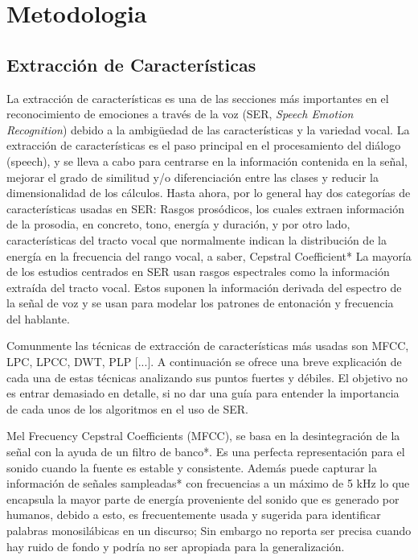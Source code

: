 \documentclass[11pt,a4paper,spanish]{book}
\begin{document}
		\chapter{Metodologia}
		\section{Extracción de Características}
		La extracción de características es una de las secciones más importantes en el reconocimiento de emociones a través de la voz (SER, \emph{Speech Emotion Recognition}) debido a la ambigüedad de las características y la variedad vocal. La extracción de características es el paso principal en el procesamiento del diálogo (speech), y se lleva a cabo para centrarse en la información contenida en la señal, mejorar el grado de similitud y/o diferenciación entre las clases y reducir la dimensionalidad de los cálculos.\cite{Hellbernd2016} Hasta ahora, por lo general hay dos categorías de características usadas en SER:
		Rasgos prosódicos, los cuales extraen información de la prosodia, en concreto, tono, energía y duración, y por otro lado, características del tracto vocal que normalmente indican la distribución de la energía en la frecuencia del rango vocal, a saber, Cepstral Coefficient*
		La mayoría de los estudios centrados en SER usan rasgos espectrales como la información extraída del tracto vocal. Estos suponen la información derivada del espectro de la señal de voz y se usan para modelar los patrones de entonación y frecuencia del hablante.\cite{Langari2020}
		
		Comunmente las técnicas de extracción de características más usadas son 
		MFCC, LPC, LPCC, DWT, PLP [...]. A continuación se ofrece una breve explicación de cada una de estas técnicas analizando sus puntos fuertes y débiles.\cite{Rashid2018} El objetivo no es entrar demasiado en detalle, si no dar una guía para entender la importancia de cada unos de los algoritmos en el uso de SER.
		
		Mel Frecuency Cepstral Coefficients (MFCC), se basa en la desintegración de la señal con la ayuda de un filtro de banco*. Es una perfecta representación para el sonido cuando la fuente es estable y consistente. Además puede capturar la información de señales sampleadas* con frecuencias a un máximo de 5 kHz lo que encapsula la mayor parte de energía proveniente del sonido que es generado por humanos, debido a esto, es frecuentemente usada y sugerida para identificar palabras monosilábicas en un discurso; Sin embargo no reporta ser precisa cuando hay ruido de fondo y podría no ser apropiada para la generalización.
		
\end{document}
